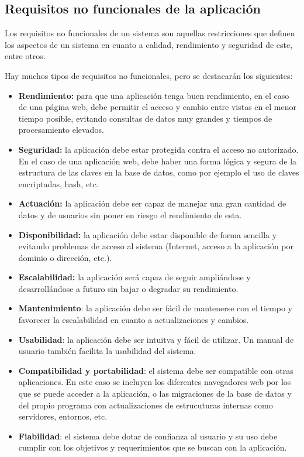 \subsection{Requisitos no funcionales de la aplicación}
Los requisitos no funcionales de un sistema son aquellas restricciones que definen los
aspectos de un sistema en cuanto a calidad, rendimiento y seguridad de este, entre otros.

Hay muchos tipos de requisitos no funcionales, pero se destacarán los siguientes:
\begin{itemize}
\item
  \textbf{Rendimiento:} para que una aplicación tenga buen rendimiento, en el caso
  de una página web, debe permitir el acceso y cambio entre vistas en el menor tiempo 
  posible, evitando consultas de datos muy grandes y tiempos de procesamiento elevados.
\item
  \textbf{Seguridad:} la aplicación debe estar protegida contra el acceso no autorizado. 
  En el caso de una aplicación web, debe haber una forma lógica y segura de la estructura
  de las claves en la base de datos, como por ejemplo el uso de claves encriptadas, hash, etc.
\item
  \textbf{Actuación:} la aplicación debe ser capaz de manejar una gran cantidad de datos
  y de usuarios sin poner en riesgo el rendimiento de esta.
\item
  \textbf{Disponibilidad:} la aplicación debe estar disponible de forma sencilla y 
  evitando problemas de acceso al sistema (Internet, acceso a la aplicación por dominio o dirección,
  etc.).
\item
  \textbf{Escalabilidad:} la aplicación será capaz de seguir ampliándose y desarrollándose
  a futuro sin bajar o degradar su rendimiento.
\item
  \textbf{Mantenimiento}: la aplicación debe ser fácil de mantenerse con el tiempo y favorecer
  la escalabilidad en cuanto a actualizaciones y cambios.
\item
  \textbf{Usabilidad}: la aplicación debe ser intuitva y fácil de utilizar. Un manual de usuario
  también facilita la usabilidad del sistema.
\item
  \textbf{Compatibilidad y portabilidad}: el sistema debe ser compatible con otras aplicaciones.
  En este caso se incluyen los diferentes navegadores web por los que se puede acceder 
  a la aplicación, o las migraciones de la base de datos y del propio programa con actualizaciones de estrucuturas internas como servidores, entornos, etc.
\item
  \textbf{Fiabilidad}: el sistema debe dotar de confianza al usuario y su uso debe cumplir
  con los objetivos y requerimientos que se buscan con la aplicación.
\end{itemize}

